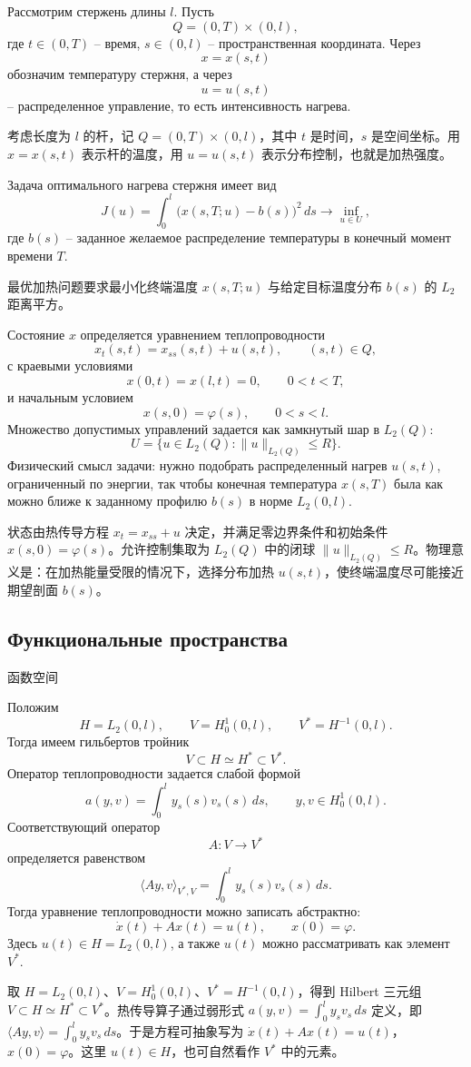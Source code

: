 \documentclass[12pt,a4paper]{article}
\newcommand{\zh}[1]{\par\noindent #1\par}
\begin{document}
Рассмотрим стержень длины \(l\). Пусть
\[
Q=(0,T)\times(0,l),
\]
где \(t\in(0,T)\) -- время, \(s\in(0,l)\) -- пространственная координата. Через
\[
x=x(s,t)
\]
обозначим температуру стержня, а через
\[
u=u(s,t)
\]
-- распределенное управление, то есть интенсивность нагрева.
\zh{考虑长度为 \(l\) 的杆，记 \(Q=(0,T)\times(0,l)\)，其中 \(t\) 是时间，\(s\) 是空间坐标。用 \(x=x(s,t)\) 表示杆的温度，用 \(u=u(s,t)\) 表示分布控制，也就是加热强度。}

Задача оптимального нагрева стержня имеет вид
\[
J(u)=\int_0^l\bigl(x(s,T;u)-b(s)\bigr)^2\,ds\to\inf_{u\in U},
\]
где \(b(s)\) -- заданное желаемое распределение температуры в конечный момент времени \(T\).
\zh{最优加热问题要求最小化终端温度 \(x(s,T;u)\) 与给定目标温度分布 \(b(s)\) 的 \(L_2\) 距离平方。}

Состояние \(x\) определяется уравнением теплопроводности
\[
x_t(s,t)=x_{ss}(s,t)+u(s,t),
\qquad (s,t)\in Q,
\]
с краевыми условиями
\[
x(0,t)=x(l,t)=0,
\qquad 0<t<T,
\]
и начальным условием
\[
x(s,0)=\varphi(s),
\qquad 0<s<l.
\]
Множество допустимых управлений задается как замкнутый шар в \(L_2(Q)\):
\[
U=\{u\in L_2(Q):\|u\|_{L_2(Q)}\le R\}.
\]
Физический смысл задачи: нужно подобрать распределенный нагрев \(u(s,t)\), ограниченный по энергии, так чтобы конечная температура \(x(s,T)\) была как можно ближе к заданному профилю \(b(s)\) в норме \(L_2(0,l)\).
\zh{状态由热传导方程 \(x_t=x_{ss}+u\) 决定，并满足零边界条件和初始条件 \(x(s,0)=\varphi(s)\)。允许控制集取为 \(L_2(Q)\) 中的闭球 \(\|u\|_{L_2(Q)}\le R\)。物理意义是：在加热能量受限的情况下，选择分布加热 \(u(s,t)\)，使终端温度尽可能接近期望剖面 \(b(s)\)。}

\subsection*{Функциональные пространства}
\zh{函数空间}
Положим
\[
H=L_2(0,l),
\qquad
V=H_0^1(0,l),
\qquad
V^*=H^{-1}(0,l).
\]
Тогда имеем гильбертов тройник
\[
V\subset H\simeq H^*\subset V^*.
\]
Оператор теплопроводности задается слабой формой
\[
a(y,v)=\int_0^l y_s(s)v_s(s)\,ds,
\qquad y,v\in H_0^1(0,l).
\]
Соответствующий оператор
\[
A:V\to V^*
\]
определяется равенством
\[
\langle Ay,v\rangle_{V^*,V}=\int_0^l y_s(s)v_s(s)\,ds.
\]
Тогда уравнение теплопроводности можно записать абстрактно:
\[
\dot x(t)+Ax(t)=u(t),
\qquad x(0)=\varphi.
\]
Здесь \(u(t)\in H=L_2(0,l)\), а также \(u(t)\) можно рассматривать как элемент \(V^*\).
\zh{取 \(H=L_2(0,l)\)、\(V=H_0^1(0,l)\)、\(V^*=H^{-1}(0,l)\)，得到 Hilbert 三元组 \(V\subset H\simeq H^*\subset V^*\)。热传导算子通过弱形式 \(a(y,v)=\int_0^l y_s v_s\,ds\) 定义，即 \(\langle Ay,v\rangle=\int_0^l y_s v_s\,ds\)。于是方程可抽象写为 \(\dot x(t)+Ax(t)=u(t)\)，\(x(0)=\varphi\)。这里 \(u(t)\in H\)，也可自然看作 \(V^*\) 中的元素。}
\end{document}
